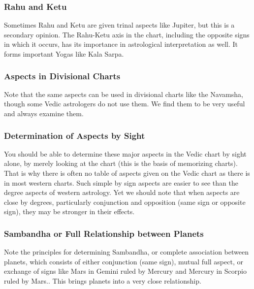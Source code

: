  

\subsubsection{Rahu and Ketu}

Sometimes Rahu and Ketu are given trinal aspects like Jupiter, but this is a secondary opinion. The Rahu-Ketu axis in the chart, including the opposite signs in which it occurs, has its importance in astrological interpretation as well. It forms important Yogas like Kala Sarpa.

 

\subsubsection{Aspects in Divisional Charts}

Note that the same aspects can be used in divisional charts like the Navamsha, though some Vedic astrologers do not use them. We find them to be very useful and always examine them.

 

\subsubsection{Determination of Aspects by Sight}

You should be able to determine these major aspects in the Vedic chart by sight alone, by merely looking at the chart (this is the basis of memorizing charts). That is why there is often  no table of aspects given on the Vedic chart as there is in most western charts. Such simple by sign aspects are easier to see than the degree aspects of western astrology. Yet we should note that when aspects are close by degrees, particularly conjunction and opposition (same sign or opposite sign), they may be stronger in their effects.

 

\subsubsection{Sambandha or Full Relationship between Planets}

Note the principles for determining Sambandha, or complete association between planets, which consists of either conjunction (same sign), mutual full aspect, or exchange of signs like Mars in Gemini ruled by Mercury and Mercury in Scorpio ruled by Mars.. This brings planets into a very close relationship.

